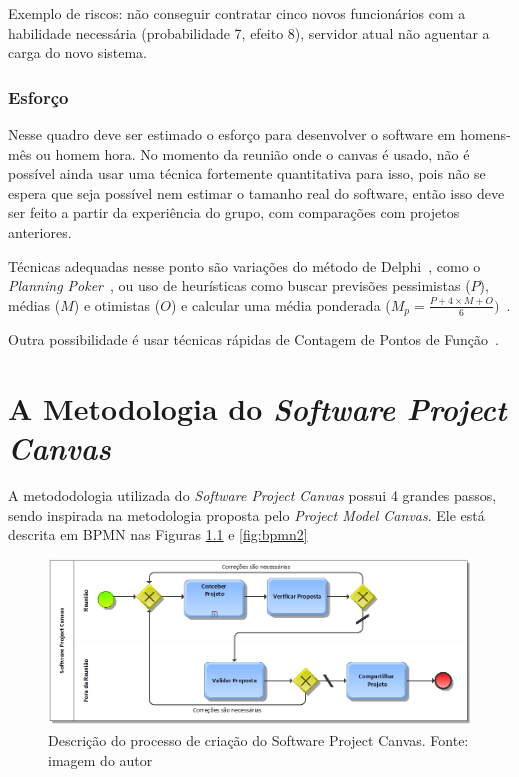 \documentclass[fontsize=12pt, a4paper,pagesize=auto,toc=listof, ,twoside,chapterprefix=false,appendixprefix=true,open=right]{scrbook}
\begin{document}
Exemplo de riscos: não conseguir contratar cinco novos funcionários com a habilidade necessária (probabilidade 7, efeito 8), servidor atual não aguentar a carga do novo sistema.

\subsection{Esforço}

Nesse quadro deve ser estimado o esforço para desenvolver o software em homens-mês ou homem hora.
 No momento da reunião onde o canvas é usado, não é possível ainda usar uma técnica fortemente quantitativa para isso, pois não se espera que seja possível nem estimar o tamanho real do software, então isso deve ser feito a partir da experiência do grupo, com comparações com projetos anteriores.

Técnicas adequadas nesse ponto são variações do método de Delphi~\citep{delphi:1966}, como o \textit{Planning Poker}~\citep{mike:agile:estimating}, ou uso de heurísticas como buscar previsões pessimistas ($P$), médias ($M$) e otimistas ($O$) e calcular uma média ponderada ($M_p=\frac{P+4\times M+O}{6})$~\citep{pmbok:6}.

Outra possibilidade é usar técnicas rápidas de Contagem de Pontos de Função~\citep{ifpug:FPM:431}.

\chapter{A Metodologia do \textit{Software Project Canvas}}

A metododologia utilizada do \textit{Software Project Canvas} possui 4 grandes passos, sendo inspirada na metodologia proposta pelo \textit{Project Model Canvas}.
 Ele está descrita em BPMN nas Figuras \ref{fig:bpmn1} e \ref{fig:bpmn2}

\begin{figure}[htb]
    \centering
    \includegraphics[width=\textwidth]{imagens/Software Project Canvas - 4 pessos.adf.png}
    \caption{Descrição do processo de criação do Software Project Canvas. Fonte: imagem do autor}
    \label{fig:bpmn1}
\end{figure}
\end{document}
